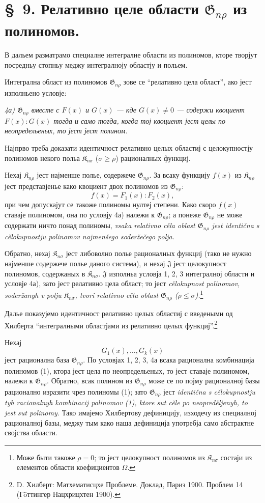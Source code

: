 ﻿\documentclass[11pt]{article}
\providecommand{\Kfield}{\mathfrak{K}}
\providecommand{\Jdom}{\mathfrak{J}}
\providecommand{\Gdom}{\mathfrak{G}}
\begin{document}
\section*{\S\ 9. Релативно целе области $\Gdom_{n\rho}$ из полиномов.}

В дальем разматрамо специалне интегралне области из полиномов, кторе творјут посредньу стопньу меджу интегралноју областју и польем.

Интегрална област из полиномов $\Gdom_{n\rho}$ зове се ``релативно цела област'', ако јест изполньено условје:

{\itshape 4а) $\Gdom_{n\rho}$ вместе с $F(x)$ и $G(x)$ --- кде $G(x)\ne0$ --- содержи квоциент $F(x):G(x)$ тогда и само тогда, когда тој квоциент јест целы по неопредельеных, то јест јест полином.}

Најпрво треба доказати идентичност релативно целых областиј с целокупностју полиномов некого польа $\Kfield_{n\sigma}$ ($\sigma\ge \rho$) рационалных функциј.

Нехај $\Kfield_{n\rho}$ јест најменше полье, содержече $\Gdom_{n\rho}$. За всаку функцију $f(x)$ из $\Kfield_{n\rho}$ јест представјенье како квоциент двох полиномов из $\Gdom_{n\rho}$:
\[
  f(x)=F_1(x):F_2(x),
\]
при чем допускајут се такоже полиномы нултеј степени. Како скоро $f(x)$ ставаје полиномом, она по условју 4а) належи к $\Gdom_{n\rho}$; а понеже $\Gdom_{n\rho}$ не може содержати ничто понад полиномы, \emph{vsaka relativno cěla oblast $\Gdom_{n\rho}$ jest identična s cělokupnostju polinomov najmenšego soderžečego polja.}

Обратно, нехај $\Kfield_{n\sigma}$ јест либоволно полье рационалных функциј (тако не нужно најменше содержече полье даного система), и нехај $\Jdom$ јест целокупност полиномов, содержаных в $\Kfield_{n\sigma}$. $\Jdom$ изполньа условја 1, 2, 3 интегралној области и условје 4а), зато јест релативно цела област; то јест \emph{cělokupnost polinomov, soderžanyh v polju $\Kfield_{n\sigma}$, tvori relativno cělu oblast $\Gdom_{n\rho}$ ($\rho\le\sigma$).}\footnote{Може быти такоже $\rho=0$; то јест целокупност полиномов из $\Kfield_{n\sigma}$ состаји из елементов области коефициентов $\Omega$.}

Далье показујемо идентичност релативно целых областиј с введеными од Хилберта ``интегралными областјами из релативно целых функциј''.\footnote{D. Хилберт: Матхематисцхе Проблеме. Доклад, Париз 1900. Проблем 14 (Гöттингер Нацхрицхтен 1900).}

Нехај
\begin{equation}
  G_1(x),\ldots,G_k(x)
\tag{1}
\end{equation}
јест рационална база $\Gdom_{n\rho}$. По условјах 1, 2, 3, 4а всака рационална комбинација полиномов (1), ктора јест цела по неопредельеных, то јест ставаје полиномом, належи к $\Gdom_{n\rho}$. Обратно, всак полином из $\Gdom_{n\rho}$ може се по појму рационалној базы рационално изразити чрез полиномы (1); зато $\Gdom_{n\rho}$ јест \emph{identična s cělokupnostju tyh racionalnyh kombinacij polinomov (1), ktore sut cěle po neopreděljenyh, to jest sut polinomy.} Тако имајемо Хилбертову дефиницију, изходечу из специалној рационалној базы, меджу тым како наша дефиниција употребја само абстрактне својства области.
\end{document}
